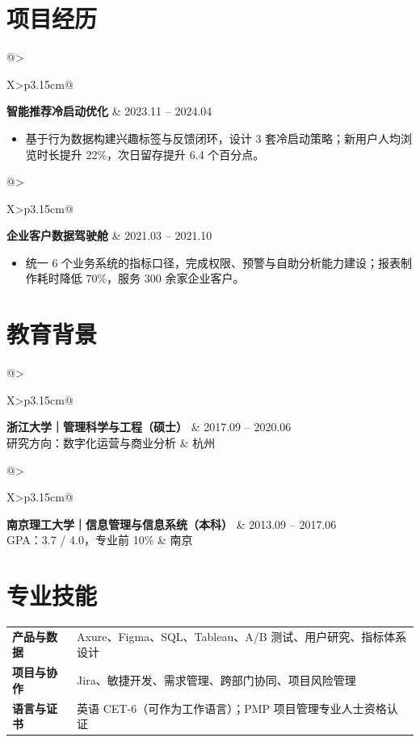 \documentclass[10pt,a4paper,fontset=fandol]{ctexart}
\makeatletter
\newcommand{\entry}[4]{%
  \begin{tabularx}{\linewidth}{@{}>{\raggedright\arraybackslash}X>{\raggedleft\arraybackslash}p{3.15cm}@{}}
    \textbf{#1} & \textcolor{Muted}{#4} \\
    \textcolor{Accent}{#2} & \textcolor{Muted}{#3}
  \end{tabularx}\vspace{-0.25em}
}
\newcommand{\project}[3]{%
  \begin{tabularx}{\linewidth}{@{}>{\raggedright\arraybackslash}X>{\raggedleft\arraybackslash}p{3.15cm}@{}}
    \textbf{#1}\hspace{0.55em}{\small\textcolor{Muted}{#2}} & \textcolor{Muted}{#3}
  \end{tabularx}\vspace{-0.35em}
}
\makeatother
\begin{document}
\section{项目经历}
\project{智能推荐冷启动优化}{项目负责人}{2023.11 -- 2024.04}
\begin{itemize}
  \item 基于行为数据构建兴趣标签与反馈闭环，设计 3 套冷启动策略；新用户人均浏览时长提升 22\%，次日留存提升 6.4 个百分点。
\end{itemize}

\project{企业客户数据驾驶舱}{产品负责人}{2021.03 -- 2021.10}
\begin{itemize}
  \item 统一 6 个业务系统的指标口径，完成权限、预警与自助分析能力建设；报表制作耗时降低 70\%，服务 300 余家企业客户。
\end{itemize}

\section{教育背景}
\entry{浙江大学｜管理科学与工程（硕士）}{研究方向：数字化运营与商业分析}{杭州}{2017.09 -- 2020.06}
\entry{南京理工大学｜信息管理与信息系统（本科）}{GPA：3.7 / 4.0，专业前 10\%}{南京}{2013.09 -- 2017.06}

\section{专业技能}
\begin{tabularx}{\linewidth}{@{}>{\raggedright\arraybackslash}p{2.05cm}X@{}}
  \textbf{\color{Primary}产品与数据} & Axure、Figma、SQL、Tableau、A/B 测试、用户研究、指标体系设计 \\
  \textbf{\color{Primary}项目与协作} & Jira、敏捷开发、需求管理、跨部门协同、项目风险管理 \\
  \textbf{\color{Primary}语言与证书} & 英语 CET-6（可作为工作语言）；PMP 项目管理专业人士资格认证
\end{tabularx}
\end{document}
